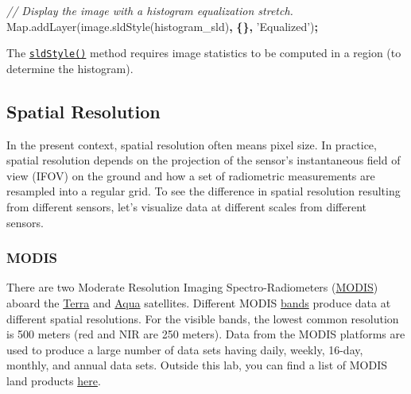 \documentclass[
]{article}
\newenvironment{Shaded}{\begin{snugshade}}{\end{snugshade}}
\newcommand{\AttributeTok}[1]{\textcolor[rgb]{0.77,0.63,0.00}{#1}}
\newcommand{\CommentTok}[1]{\textcolor[rgb]{0.56,0.35,0.01}{\textit{#1}}}
\newcommand{\NormalTok}[1]{#1}
\newcommand{\OperatorTok}[1]{\textcolor[rgb]{0.81,0.36,0.00}{\textbf{#1}}}
\newcommand{\StringTok}[1]{\textcolor[rgb]{0.31,0.60,0.02}{#1}}
\newcommand{\VariableTok}[1]{\textcolor[rgb]{0.00,0.00,0.00}{#1}}
\begin{document}
\begin{enumerate}
\begin{Shaded}
\begin{Highlighting}[]
  \CommentTok{// Display the image with a histogram equalization stretch.}
  \VariableTok{Map}\NormalTok{.}\AttributeTok{addLayer}\NormalTok{(}\VariableTok{image}\NormalTok{.}\AttributeTok{sldStyle}\NormalTok{(histogram_sld)}\OperatorTok{,} \OperatorTok{\{\},} \StringTok{'Equalized'}\NormalTok{)}\OperatorTok{;}
\end{Highlighting}
\end{Shaded}

  The \href{https://devsite.googleplex.com/earth-engine/image_visualization\#styled-layer-descriptors}{\texttt{sldStyle()}} method requires image statistics to be computed in a region (to determine the histogram).
\end{enumerate}

\hypertarget{spatial-resolution}{%
\subsection{Spatial Resolution}\label{spatial-resolution}}

In the present context, spatial resolution often means pixel size. In practice, spatial resolution depends on the projection of the sensor's instantaneous field of view (IFOV) on the ground and how a set of radiometric measurements are resampled into a regular grid. To see the difference in spatial resolution resulting from different sensors, let's visualize data at different scales from different sensors.

\hypertarget{modis}{%
\subsubsection{MODIS}\label{modis}}

There are two Moderate Resolution Imaging Spectro-Radiometers (\href{http://modis.gsfc.nasa.gov/}{MODIS}) aboard the \href{http://terra.nasa.gov/}{Terra} and \href{http://aqua.nasa.gov/}{Aqua} satellites. Different MODIS \href{http://modis.gsfc.nasa.gov/about/specifications.php}{bands} produce data at different spatial resolutions. For the visible bands, the lowest common resolution is 500 meters (red and NIR are 250 meters). Data from the MODIS platforms are used to produce a large number of data sets having daily, weekly, 16-day, monthly, and annual data sets. Outside this lab, you can find a list of MODIS land products \href{https://lpdaac.usgs.gov/dataset_discovery/modis/modis_products_table}{here}.
\end{document}
